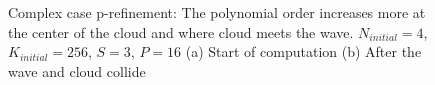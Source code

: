 \begin{figure}[H]
	\centering
	\hfill
	\caption{Complex case p-refinement: The polynomial order increases more at the center of the cloud and where cloud meets the wave. \(N_{initial} = 4\), \(K_{initial} = 256\), \(S = 3\), \(P = 16\) (a) Start of computation (b) After the wave and cloud collide}\label{fig:cloud_N}
\end{figure}

